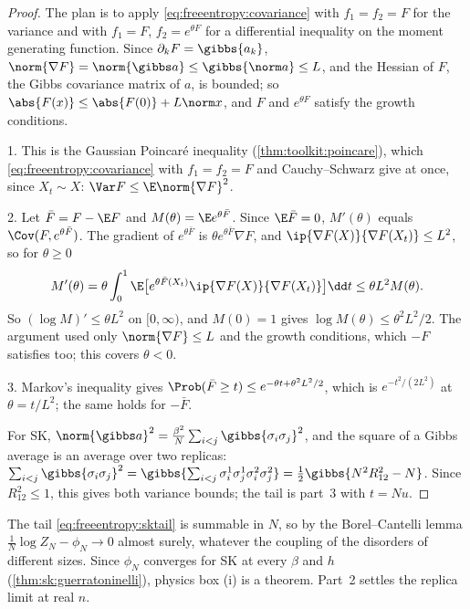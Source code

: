 \begin{refsection}
\begin{proof}
The plan is to apply \eqref{eq:freeentropy:covariance} with $f_1=f_2=F$ for the variance and with $f_1=F$, $f_2=e^{\theta F}$ for a differential inequality on the moment generating function. Since $\partial_kF=\gibbs{a_k}$, $\norm{\nabla F}=\norm{\gibbs a}\le\gibbs{\norm a}\le L$, and the Hessian of $F$, the Gibbs covariance matrix of $a$, is bounded; so $\abs{F(x)}\le\abs{F(0)}+L\norm x$, and $F$ and $e^{\theta F}$ satisfy the growth conditions.

1. This is the Gaussian Poincaré inequality (\cref{thm:toolkit:poincare}), which \eqref{eq:freeentropy:covariance} with $f_1=f_2=F$ and Cauchy--Schwarz give at once, since $X_t\sim X$: $\Var F\le\E\norm{\nabla F}^2$.

2. Let $\bar F=F-\E F$ and $M(\theta)=\E e^{\theta\bar F}$. Since $\E\bar F=0$, $M'(\theta)$ equals $\Cov(F,e^{\theta\bar F})$. The gradient of $e^{\theta\bar F}$ is $\theta e^{\theta\bar F}\nabla F$, and $\ip{\nabla F(X)}{\nabla F(X_t)}\le L^2$, so for $\theta\ge0$
\[
M'(\theta)=\theta\int_0^1\E\bigl[e^{\theta\bar F(X_t)}\ip{\nabla F(X)}{\nabla F(X_t)}\bigr]\dd t\le\theta L^2M(\theta).
\]
So $(\log M)'\le\theta L^2$ on $[0,\infty)$, and $M(0)=1$ gives $\log M(\theta)\le\theta^2L^2/2$. The argument used only $\norm{\nabla F}\le L$ and the growth conditions, which $-F$ satisfies too; this covers $\theta<0$.

3. Markov's inequality gives $\Prob(\bar F\ge t)\le e^{-\theta t+\theta^2L^2/2}$, which is $e^{-t^2/(2L^2)}$ at $\theta=t/L^2$; the same holds for $-\bar F$.

For SK, $\norm{\gibbs a}^2=\frac{\beta^2}N\sum_{i<j}\gibbs{\sigma_i\sigma_j}^2$, and the square of a Gibbs average is an average over two replicas: $\sum_{i<j}\gibbs{\sigma_i\sigma_j}^2=\gibbs{\sum_{i<j}\sigma^1_i\sigma^1_j\sigma^2_i\sigma^2_j}=\frac12\gibbs{N^2R_{12}^2-N}$. Since $R_{12}^2\le1$, this gives both variance bounds; the tail is part~3 with $t=Nu$.
\end{proof}

The tail \eqref{eq:freeentropy:sktail} is summable in $N$, so by the Borel--Cantelli lemma $\frac1N\log Z_N-\phi_N\to0$ almost surely, whatever the coupling of the disorders of different sizes. Since $\phi_N$ converges for SK at every $\beta$ and $h$ (\cref{thm:sk:guerratoninelli}), physics box (i) is a theorem. Part~2 settles the replica limit at real $n$.


\end{refsection}
